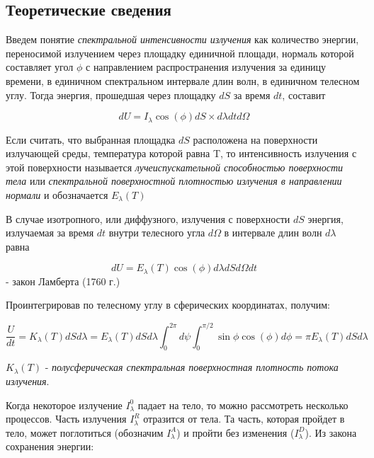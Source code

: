 \documentclass[12pt,a4paper]{article}
\begin{document}
\subsection{Теоретические сведения}

\par Введем понятие \textit{спектральной интенсивности излучения}  как количество энергии, переносимой излучением через площадку единичной площади, нормаль которой составляет угол $\phi$ с направлением распространения излучения за единицу времени, в единичном спектральном интервале длин волн, в единичном телесном углу. Тогда энергия, прошедшая через площадку $dS$ за время $dt$, составит

\begin{equation}
dU = I_{\lambda}\cos(\phi)dS{\times}d{\lambda}dtd\Omega
\end{equation}

\par Если считать, что выбранная площадка $dS$ расположена на поверхности излучающей среды, температура которой равна T, то интенсивность излучения с этой поверхности называется \textit{лучеиспускательной способностью поверхности тела} или \textit{спектральной поверхностной плотностью излучения в направлении нормали} и обозначается $E_{\lambda}(T)$

\par В случае изотропного, или диффузного, излучения с поверхности $dS$ энергия, излучаемая за время $dt$ внутри телесного угла $d\Omega$ в интервале длин волн $d\lambda$ равна

\begin{equation}
dU = E_{\lambda}(T)\cos(\phi)d{\lambda}dSd{\Omega}dt
\end{equation}  
- закон Ламберта (1760 г.)

Проинтегрировав по телесному углу в сферических координатах, получим:

\begin{equation}
\frac{U}{dt} = K_{\lambda}(T)dSd\lambda = E_{\lambda}(T)dSd\lambda\int_0^{2\pi}d\psi\int_0^{\pi/2}\sin{\phi}\cos(\phi)d\phi = {\pi}E_{\lambda}(T)dSd\lambda
\end{equation}

$K_{\lambda}(T)$ - \textit{полусферическая спектральная поверхностная плотность потока излучения}. 

\par Когда некоторое излучение $I_{\lambda}^0$ падает на тело, то можно рассмотреть несколько процессов. Часть излучения $I_{\lambda}^R$ отразится от тела. Та часть, которая пройдет в тело, может поглотиться (обозначим $I_{\lambda}^A$) и пройти без изменения ($I_{\lambda}^D$). Из закона сохранения энергии: 
\end{document}

